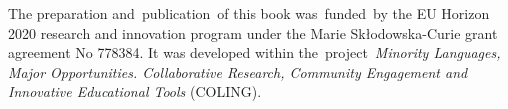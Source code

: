 \begin{refsection}
The preparation and publication of this book was funded by the EU Horizon 2020 research and innovation program under the Marie Skłodowska-Curie grant agreement No 778384. It was developed within the project \textit{Minority Languages, Major Opportunities. Collaborative Research, Community Engagement and Innovative Educational Tools} (COLING).

\end{refsection}
